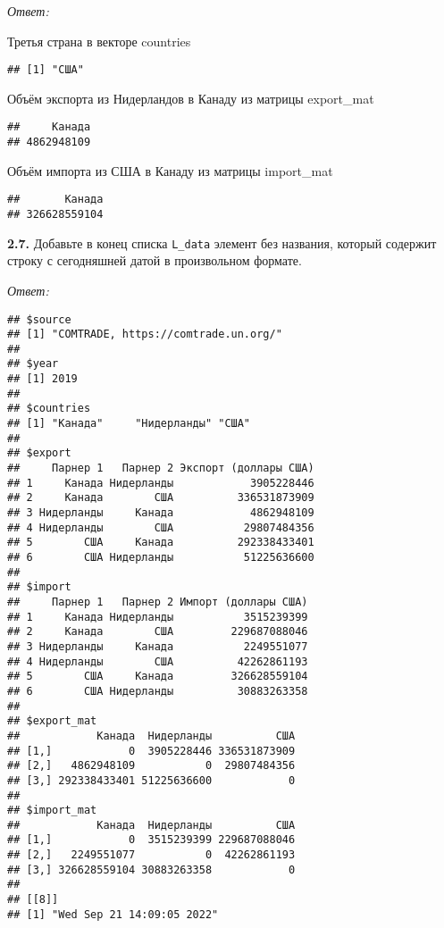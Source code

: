 \documentclass[
]{article}
\begin{document}
\emph{Ответ:}

Третья страна в векторе countries

\begin{verbatim}
## [1] "США"
\end{verbatim}

Объём экспорта из Нидерландов в Канаду из матрицы export\_mat

\begin{verbatim}
##     Канада 
## 4862948109
\end{verbatim}

Объём импорта из США в Канаду из матрицы import\_mat

\begin{verbatim}
##       Канада 
## 326628559104
\end{verbatim}

\textbf{2.7.} Добавьте в конец списка \texttt{L\_data} элемент без
названия, который содержит строку с сегодняшней датой в произвольном
формате.

\emph{Ответ:}

\begin{verbatim}
## $source
## [1] "COMTRADE, https://comtrade.un.org/"
## 
## $year
## [1] 2019
## 
## $countries
## [1] "Канада"     "Нидерланды" "США"       
## 
## $export
##     Парнер 1   Парнер 2 Экспорт (доллары США)
## 1     Канада Нидерланды            3905228446
## 2     Канада        США          336531873909
## 3 Нидерланды     Канада            4862948109
## 4 Нидерланды        США           29807484356
## 5        США     Канада          292338433401
## 6        США Нидерланды           51225636600
## 
## $import
##     Парнер 1   Парнер 2 Импорт (доллары США)
## 1     Канада Нидерланды           3515239399
## 2     Канада        США         229687088046
## 3 Нидерланды     Канада           2249551077
## 4 Нидерланды        США          42262861193
## 5        США     Канада         326628559104
## 6        США Нидерланды          30883263358
## 
## $export_mat
##            Канада  Нидерланды          США
## [1,]            0  3905228446 336531873909
## [2,]   4862948109           0  29807484356
## [3,] 292338433401 51225636600            0
## 
## $import_mat
##            Канада  Нидерланды          США
## [1,]            0  3515239399 229687088046
## [2,]   2249551077           0  42262861193
## [3,] 326628559104 30883263358            0
## 
## [[8]]
## [1] "Wed Sep 21 14:09:05 2022"
\end{verbatim}
\end{document}
